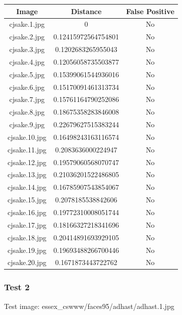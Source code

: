 \documentclass[12pt]{article}
\begin{document}
\begin{center}
\begin{tabular}{ccc}
Image & Distance & False Positive \\
\hline
cjsake.1.jpg & 0 & No \\
cjsake.2.jpg & 0.12415972564754801 & No \\
cjsake.3.jpg & 0.1202683265955043 & No \\
cjsake.4.jpg & 0.12056058735503877 & No \\
cjsake.5.jpg & 0.15399061544936016 & No \\
cjsake.6.jpg & 0.15170091461313734 & No \\
cjsake.7.jpg & 0.15761164790252086 & No \\
cjsake.8.jpg & 0.18675358283846008 & No \\
cjsake.9.jpg & 0.22679627515383244 & No \\
cjsake.10.jpg & 0.16498243163116574 & No \\
cjsake.11.jpg & 0.2083636000224947 & No \\
cjsake.12.jpg & 0.19579060568070747 & No \\
cjsake.13.jpg & 0.21036201522486805 & No \\
cjsake.14.jpg & 0.16785907543854067 & No \\
cjsake.15.jpg & 0.2078185538842606 & No \\
cjsake.16.jpg & 0.19772310008051744 & No \\
cjsake.17.jpg & 0.18166327218341696 & No \\
cjsake.18.jpg & 0.20414891693929105 & No \\
cjsake.19.jpg & 0.19693488266700446 & No \\
cjsake.20.jpg & 0.1671873443722762 & No \\
\end{tabular}
\end{center}

\subsubsection{Test 2}
Test image: essex\_cswww/faces95/adhast/adhast.1.jpg
\end{document}
